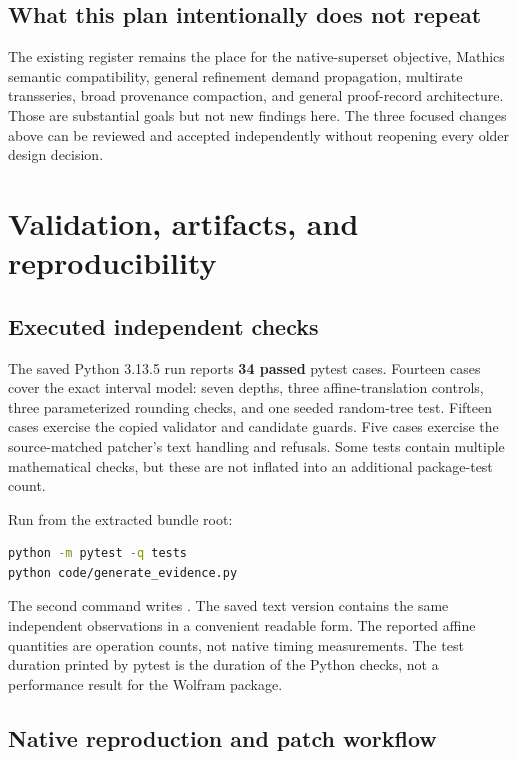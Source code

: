 \documentclass[11pt,letterpaper]{article}
\begin{document}
\subsection{What this plan intentionally does not repeat}

The existing register remains the place for the native-superset objective,
Mathics semantic compatibility, general refinement demand propagation,
multirate transseries, broad provenance compaction, and general proof-record
architecture. Those are substantial goals but not new findings here. The three
focused changes above can be reviewed and accepted independently without
reopening every older design decision.\cite{status,w3,w4}

\section{Validation, artifacts, and reproducibility}
\label{sec:validation}

\subsection{Executed independent checks}

The saved Python 3.13.5 run reports \textbf{34 passed} pytest cases. Fourteen cases
cover the exact interval model: seven depths, three affine-translation controls,
three parameterized rounding checks, and one seeded random-tree test. Fifteen
cases exercise the copied validator and candidate guards. Five cases exercise
the source-matched patcher's text handling and refusals. Some tests contain
multiple mathematical checks, but these are not inflated into an additional
package-test count.

Run from the extracted bundle root:
\begin{lstlisting}[language=bash]
python -m pytest -q tests
python code/generate_evidence.py
\end{lstlisting}

The second command writes . The saved text
version contains the same independent observations in a convenient readable
form. The reported affine quantities are operation counts, not native timing
measurements. The test duration printed by pytest is the duration of the Python
checks, not a performance result for the Wolfram package.

\subsection{Native reproduction and patch workflow}
\end{document}
